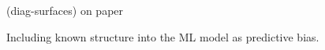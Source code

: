\documentclass[
	fontsize=10pt, %
	twoside=false, %
	secnumdepth=1, %
]{kaobook}
\begin{document}



\begin{figure}[h]
  \centering
  (diag-surfaces) on paper
  \caption{Including known structure into the ML model as predictive bias.}
  \label{fig:diag-surfaces}
\end{figure}








\end{document}
